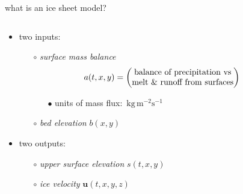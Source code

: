 \documentclass[svgnames,
               hyperref={colorlinks,citecolor=DeepPink4,linkcolor=FireBrick,urlcolor=Maroon},
               usepdftitle=false]  %
               {beamer}
\newcommand{\bu}{\mathbf{u}}
\begin{document}
\begin{frame}{what is an ice sheet model?}

\begin{columns}
\begin{column}{0.6\textwidth}
\begin{itemize}
\begin{definition}
an \alert{ice sheet model} is a \underline{map} which simulates an ice sheet in a climate
\end{definition} 
\item two inputs:
    \begin{itemize}
    \item[$\circ$] \emph{surface mass balance}
$$\hspace{-7mm} a(t,x,y) = \begin{pmatrix}
\text{balance of precipitation vs} \\
\text{melt \& runoff from surfaces}
\end{pmatrix}$$

\vspace{-3mm}
        \begin{itemize}
        \item[{\scriptsize $\bullet$}] units of mass flux:\, $\text{kg}\, \text{m}^{-2} \text{s}^{-1}$
        \end{itemize}

    \item[$\circ$] \emph{bed elevation} $b(x,y)$
    \end{itemize}
\item two outputs:
    \begin{itemize}
    \item[$\circ$] \emph{upper surface elevation} $s(t,x,y)$
    \item[$\circ$] \emph{ice velocity} $\bu(t,x,y,z)$
    \end{itemize}


\end{itemize}
\end{column}
\end{columns}
\end{frame}
\end{document}
